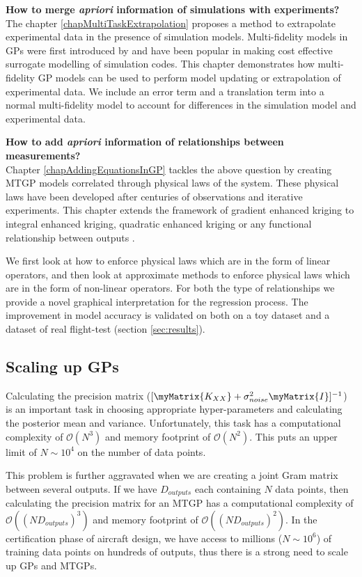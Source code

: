 \textbf{How to merge \textit{apriori} information of simulations with experiments?} \\
The chapter \ref{chapMultiTaskExtrapolation} proposes a method to extrapolate experimental data in the presence of simulation models. Multi-fidelity models in GPs were first introduced by \cite{kennedy2000predicting} and have been popular in making cost effective surrogate modelling of simulation codes. This chapter demonstrates how multi-fidelity GP models can be used to perform model updating or extrapolation of experimental data. We include an error term and a translation term into a normal multi-fidelity model to account for differences in the simulation model and experimental data. 

\textbf{How to add \textit{apriori} information of relationships between measurements?} \\
Chapter \ref{chapAddingEquationsInGP} tackles the above question by creating MTGP models correlated through physical laws of the system. These physical laws have been developed after centuries of observations and iterative experiments. This chapter extends the framework of gradient enhanced kriging to integral enhanced kriging, quadratic enhanced kriging or any functional relationship between outputs \cite{Constantinescu2013}. 

We first look at how to enforce physical laws which are in the form of linear operators, and then look at approximate methods to enforce physical laws which are in the form of non-linear operators. For both the type of relationships we provide a novel graphical interpretation for the regression process. The improvement in model accuracy is validated on both on a toy dataset and a dataset of real flight-test (section \ref{sec:results}). 

\subsection{Scaling up GPs}
Calculating the precision matrix ($[\myMatrix{K_{XX}}+ \sigma_{noise}^{2}\myMatrix{I}]^{-1}$) is an important task in choosing appropriate hyper-parameters and calculating the posterior mean and variance. Unfortunately, this task has a computational complexity of $\mathcal{O}\left ( N^{3} \right )$ and memory footprint of $\mathcal{O}\left ( N^{2} \right )$. This puts an upper limit of $N \sim 10^4$ on the number of data points. 

This problem is further aggravated when we are creating a joint Gram matrix between several outputs. If we have $D_{outputs}$ each containing $N$ data points, then calculating the precision matrix for an MTGP has a computational complexity of \(\mathcal{O}\left ( (N  D_{outputs})^{3} \right )\) and memory footprint of \(\mathcal{O}\left ( (N  D_{outputs})^{2} \right )\). In the certification phase of aircraft design, we have access to millions ($N \sim 10^6$) of training data points on hundreds of outputs, thus there is a strong need to scale up GPs and MTGPs.  

